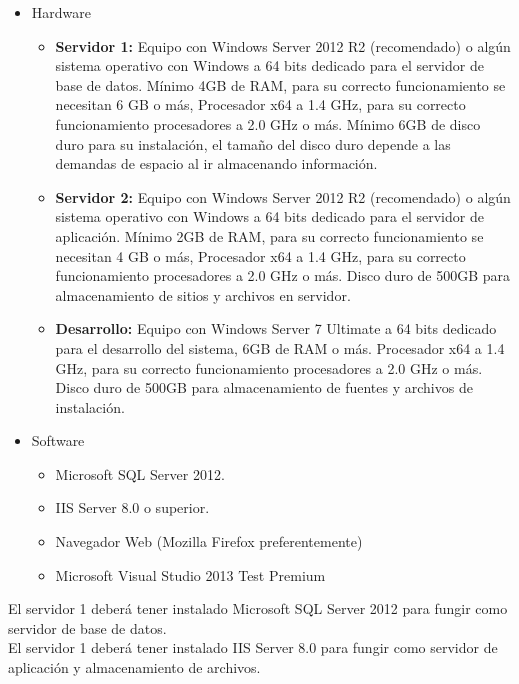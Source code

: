 			\begin{itemize}
				\item Hardware
					\begin{itemize}
						\item \textbf{Servidor 1:} Equipo con Windows Server 2012 R2 (recomendado) o alg\'un sistema operativo con Windows a 64 bits dedicado para el servidor de base de datos. M\'inimo 4GB de RAM, para su correcto funcionamiento se necesitan 6 GB o m\'as, Procesador x64 a 1.4 GHz, para su correcto funcionamiento procesadores a 2.0 GHz o m\'as. M\'inimo 6GB de disco duro para su instalaci\'on, el tama\~no del disco duro depende a las demandas de espacio al ir almacenando informaci\'on.

						\item \textbf{Servidor 2:} Equipo con Windows Server 2012 R2 (recomendado) o alg\'un sistema operativo con Windows a 64 bits dedicado para el servidor de aplicaci\'on. M\'inimo 2GB de RAM, para su correcto funcionamiento se necesitan 4 GB o m\'as, Procesador x64 a 1.4 GHz, para su correcto funcionamiento procesadores a 2.0 GHz o más. Disco duro de 500GB para almacenamiento de sitios y archivos en servidor.

						\item \textbf{Desarrollo:} Equipo con Windows Server 7 Ultimate a 64 bits dedicado para el desarrollo del sistema, 6GB de RAM o m\'as. Procesador x64 a 1.4 GHz, para su correcto funcionamiento procesadores a 2.0 GHz o m\'as. Disco duro de 500GB para almacenamiento de fuentes y archivos de instalaci\'on.

					\end{itemize}
				\item Software
					\begin{itemize}
						\item Microsoft SQL Server 2012.
						\item IIS Server 8.0 o superior.
						\item Navegador Web (Mozilla Firefox preferentemente)
						\item Microsoft Visual Studio 2013 Test Premium
					\end{itemize}
			\end{itemize}

		El servidor 1 deber\'a tener instalado Microsoft SQL Server 2012 para fungir como servidor de base de datos.\\

		El servidor 1 deber\'a tener instalado IIS Server 8.0 para fungir como servidor de aplicaci\'on y almacenamiento de archivos.\\

